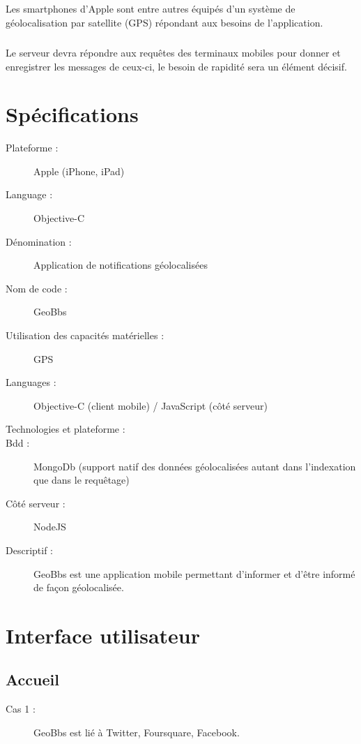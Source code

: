 \documentclass[a4paper,12pt]{report}
\begin{document}
\begin{onehalfspace}
  \paragraph*{}
  Les smartphones d'Apple sont entre autres équipés d'un système de géolocalisation par satellite (GPS) répondant aux besoins de l'application.

  \paragraph*{}
  Le serveur devra répondre aux requêtes des terminaux mobiles pour donner et enregistrer les messages de ceux-ci, le besoin de rapidité sera un élément décisif.

  \chapter*{Spécifications}

  \begin{description}
  \item[Plateforme :] Apple (iPhone, iPad)
  \item[Language :] Objective-C
  \item[Dénomination :] Application de notifications géolocalisées
  \item[Nom de code :] GeoBbs
  \item[Utilisation des capacités matérielles :] GPS
  \item[Languages :] Objective-C (client mobile) / JavaScript (côté serveur)
  \item[Technologies et plateforme :]
  \item[Bdd :] MongoDb (support natif des données géolocalisées autant dans l’indexation que dans le requêtage)
  \item[Côté serveur :] NodeJS
  \item[Descriptif :] GeoBbs est une application mobile permettant d’informer et d’être informé de façon géolocalisée.
  \end{description}

  \newpage

  \chapter*{Interface utilisateur}
  \section*{Accueil}
  \begin{description}
    \item[Cas 1 :] GeoBbs est lié à Twitter, Foursquare, Facebook.


\end{description}
\end{onehalfspace}
\end{document}
